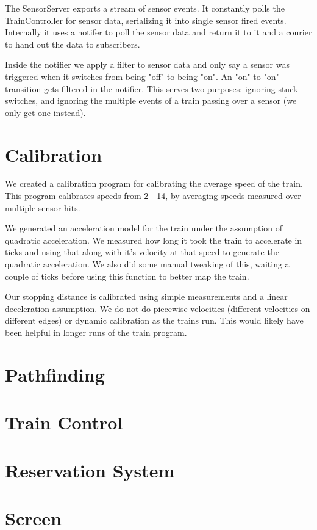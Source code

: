 \documentclass{article}
\begin{document}
The SensorServer exports a stream of sensor events. It constantly polls the TrainController for sensor data, serializing it into single sensor fired events. Internally it uses a notifer to poll the sensor data and return it to it and a courier to hand out the data to subscribers.

Inside the notifier we apply a filter to sensor data and only say a sensor was triggered when it switches from being "off" to being "on". An "on" to "on" transition gets filtered in the notifier. This serves two purposes: ignoring stuck switches, and ignoring the multiple events of a train passing over a sensor (we only get one instead).

\section{Calibration}

We created a calibration program for calibrating the average speed of the train. This program calibrates speeds from 2 - 14, by averaging speeds measured over multiple sensor hits. 

We generated an acceleration model for the train under the assumption of quadratic acceleration. We measured how long it took the train to accelerate in ticks and using that along with it's velocity at that speed to generate the quadratic acceleration. We also did some manual tweaking of this, waiting a couple of ticks before using this function to better map the train.

Our stopping distance is calibrated using simple measurements and a linear deceleration assumption. We do not do piecewise velocities (different velocities on different edges) or dynamic calibration as the trains run. This would likely have been helpful in longer runs of the train program.

\section{Pathfinding}

\section{Train Control}

\section{Reservation System}

\section{Screen}
\end{document}
